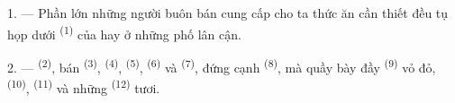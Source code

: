%
%
%
%
%

\VUsaut{4.0mm}
\VUsaut{3.0mm}

\VUsaut{3.0mm}

1. --- Phần lớn những người buôn bán cung cấp cho ta thức ăn cần thiết đều tụ họp dưới
 \textsuperscript{(1)} của  hay ở những phố lân cận.

2. ---  \textsuperscript{(2)}, bán 
\textsuperscript{(3)},  \textsuperscript{(4)}, 
\textsuperscript{(5)},  \textsuperscript{(6)} và  \textsuperscript{(7)}, đứng cạnh 
\textsuperscript{(8)}, mà quầy bày đầy  \textsuperscript{(9)} vỏ
đỏ,  \textsuperscript{(10)}, 
\textsuperscript{(11)} và những  \textsuperscript{(12)} tươi.

